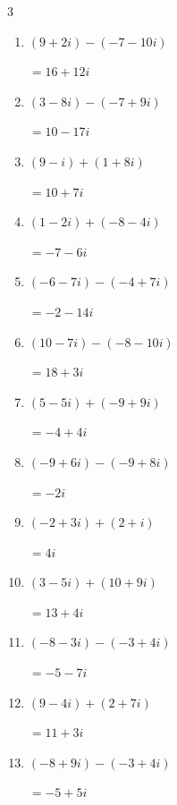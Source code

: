 \begin{multicols}{3}
\begin{enumerate}
        $\displaystyle =15+9i$

  \item $\displaystyle (9+2i) - (-7-10i)$

        $\displaystyle =16+12i$

  \item $\displaystyle (3-8i) - (-7+9i)$

        $\displaystyle =10-17i$

  \item $\displaystyle (9-i) + (1+8i)$

        $\displaystyle =10+7i$

  \item $\displaystyle (1-2i) + (-8-4i)$

        $\displaystyle =-7-6i$

  \item $\displaystyle (-6-7i) - (-4+7i)$

        $\displaystyle =-2-14i$

  \item $\displaystyle (10-7i) - (-8-10i)$

        $\displaystyle =18+3i$

  \item $\displaystyle (5-5i) + (-9+9i)$

        $\displaystyle =-4+4i$

  \item $\displaystyle (-9+6i) - (-9+8i)$

        $\displaystyle =-2i$

  \item $\displaystyle (-2+3i) + (2+i)$

        $\displaystyle =4i$

  \item $\displaystyle (3-5i) + (10+9i)$

        $\displaystyle =13+4i$

  \item $\displaystyle (-8-3i) - (-3+4i)$

        $\displaystyle =-5-7i$

\columnbreak %

  \item $\displaystyle (9-4i) + (2+7i)$

        $\displaystyle =11+3i$

  \item $\displaystyle (-8+9i) - (-3+4i)$

        $\displaystyle =-5+5i$


\end{enumerate}
\end{multicols}
